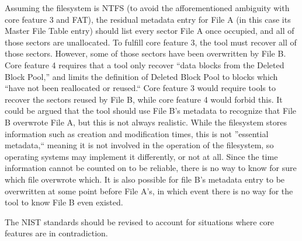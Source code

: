 Assuming the filesystem is NTFS (to avoid the afforementioned ambiguity with core feature 3 and FAT), the residual metadata entry for File A (in this case its Master File Table entry) should list every sector File A once occupied, and all of those sectors are unallocated. To fulfill core feature 3, the tool must recover all of those sectors. However, some of those sectors have been overwritten by File B. Core feature 4 requires that a tool only recover ``data blocks from the Deleted Block Pool,'' and limits the definition of Deleted Block Pool to blocks which ``have not been reallocated or reused.`` %
Core feature 3 would require tools to recover the sectors reused by File B, while core feature 4 would forbid this. It could be argued that the tool should use File B's metadata to recognize that File B overwrote File A, but this is not always realistic. While the filesystem stores information such as creation and modification times, this is not ''essential metadata,`` meaning it is not involved in the operation of the filesystem, so operating systems may implement it differently, or not at all. %
Since the time information cannot be counted on to be reliable, there is no way to know for sure which file overwrote which. It is also possible for file B's metadata entry to be overwritten at some point before File A's, in which event there is no way for the tool to know File B even existed.

The NIST standards should be revised to account for situations where core features are in contradiction.

